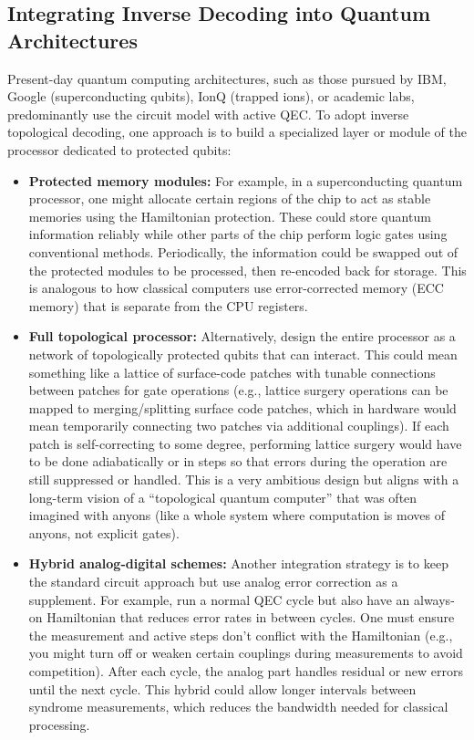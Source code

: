 \documentclass[11pt]{article}
\begin{document}
\subsection{Integrating Inverse Decoding into Quantum Architectures}
Present-day quantum computing architectures, such as those pursued by IBM, Google (superconducting qubits), IonQ (trapped ions), or academic labs, predominantly use the circuit model with active QEC. To adopt inverse topological decoding, one approach is to build a specialized layer or module of the processor dedicated to protected qubits:
\begin{itemize}
    \item \textbf{Protected memory modules:} For example, in a superconducting quantum processor, one might allocate certain regions of the chip to act as stable memories using the Hamiltonian protection. These could store quantum information reliably while other parts of the chip perform logic gates using conventional methods. Periodically, the information could be swapped out of the protected modules to be processed, then re-encoded back for storage. This is analogous to how classical computers use error-corrected memory (ECC memory) that is separate from the CPU registers.
    \item \textbf{Full topological processor:} Alternatively, design the entire processor as a network of topologically protected qubits that can interact. This could mean something like a lattice of surface-code patches with tunable connections between patches for gate operations (e.g., lattice surgery operations can be mapped to merging/splitting surface code patches, which in hardware would mean temporarily connecting two patches via additional couplings). If each patch is self-correcting to some degree, performing lattice surgery would have to be done adiabatically or in steps so that errors during the operation are still suppressed or handled. This is a very ambitious design but aligns with a long-term vision of a ``topological quantum computer'' that was often imagined with anyons (like a whole system where computation is moves of anyons, not explicit gates).
    \item \textbf{Hybrid analog-digital schemes:} Another integration strategy is to keep the standard circuit approach but use analog error correction as a supplement. For example, run a normal QEC cycle but also have an always-on Hamiltonian that reduces error rates in between cycles. One must ensure the measurement and active steps don't conflict with the Hamiltonian (e.g., you might turn off or weaken certain couplings during measurements to avoid competition). After each cycle, the analog part handles residual or new errors until the next cycle. This hybrid could allow longer intervals between syndrome measurements, which reduces the bandwidth needed for classical processing.
\end{itemize}
\end{document}
